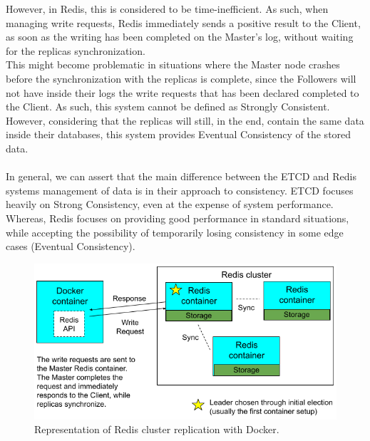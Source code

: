 However, in Redis, this is considered to be time-inefficient. As such, when managing write requests, Redis immediately sends a positive result to the Client, as soon as the writing has been completed on the Master's log, without waiting for the replicas synchronization. \\
This might become problematic in situations where the Master node crashes before the synchronization with the replicas is complete, since the Followers will not have inside their logs the write requests that has been declared completed to the Client. As such, this system cannot be defined as Strongly Consistent. However, considering that the replicas will still, in the end, contain the same data inside their databases, this system provides Eventual Consistency of the stored data. \\ \\
In general, we can assert that the main difference between the ETCD and Redis systems management of data is in their approach to consistency. ETCD focuses heavily on Strong Consistency, even at the expense of system performance. Whereas, Redis focuses on providing good performance in standard situations, while accepting the possibility of temporarily losing consistency in some edge cases (Eventual Consistency).

\begin{figure}
	\centering
	\includegraphics[width=0.85\linewidth]{"immagini/Technologies/Redis cluster"}
	\caption[Representation of Redis cluster replication with Docker.]{Representation of Redis cluster replication with Docker.}
	\label{fig:redis-cluster}
\end{figure}

